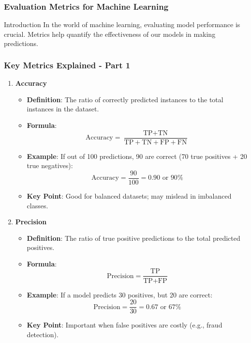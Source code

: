 \documentclass[aspectratio=169]{beamer}
\begin{document}
\begin{frame}[fragile]
    \frametitle{Evaluation Metrics for Machine Learning}
    \begin{block}{Introduction}
        In the world of machine learning, evaluating model performance is crucial. Metrics help quantify the effectiveness of our models in making predictions.
    \end{block}
\end{frame}

\begin{frame}[fragile]
    \frametitle{Key Metrics Explained - Part 1}
    \begin{enumerate}
        \item \textbf{Accuracy}
        \begin{itemize}
            \item \textbf{Definition}: The ratio of correctly predicted instances to the total instances in the dataset.
            \item \textbf{Formula}:
            \begin{equation}
            \text{Accuracy} = \frac{\text{TP} + \text{TN}}{\text{TP} + \text{TN} + \text{FP} + \text{FN}}
            \end{equation}
            \item \textbf{Example}: If out of 100 predictions, 90 are correct (70 true positives + 20 true negatives):
            \begin{equation}
            \text{Accuracy} = \frac{90}{100} = 0.90 \text{ or } 90\%
            \end{equation}
            \item \textbf{Key Point}: Good for balanced datasets; may mislead in imbalanced classes.
        \end{itemize}

        \item \textbf{Precision}
        \begin{itemize}
            \item \textbf{Definition}: The ratio of true positive predictions to the total predicted positives.
            \item \textbf{Formula}:
            \begin{equation}
            \text{Precision} = \frac{\text{TP}}{\text{TP} + \text{FP}}
            \end{equation}
            \item \textbf{Example}: If a model predicts 30 positives, but 20 are correct:
            \begin{equation}
            \text{Precision} = \frac{20}{30} = 0.67 \text{ or } 67\%
            \end{equation}
            \item \textbf{Key Point}: Important when false positives are costly (e.g., fraud detection).
        \end{itemize}
    \end{enumerate}
\end{frame}
\end{document}
